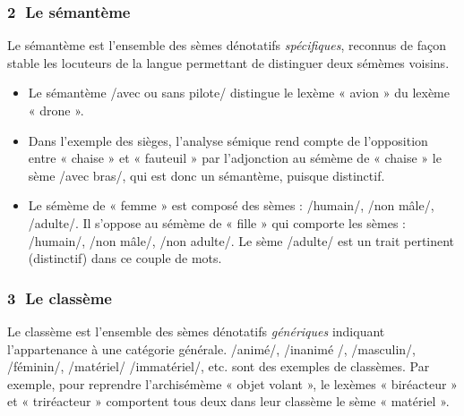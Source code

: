 \subsubsection*{\textcircled{\scriptsize 2} Le sémantème}
Le sémantème est l’ensemble des sèmes dénotatifs \textit{spécifiques}, reconnus de façon stable les locuteurs de la langue permettant de distinguer deux sémèmes voisins.
\begin{itemize}
\item Le sémantème /avec ou sans pilote/ distingue le lexème « avion » du lexème « drone ».
\item Dans l’exemple des sièges, l’analyse sémique rend compte de l’opposition entre « chaise » et « fauteuil » par l’adjonction au sémème de « chaise » le sème /avec bras/, qui est donc un sémantème, puisque distinctif.
\item Le sémème de « femme » est composé des sèmes : /humain/, /non mâle/, /adulte/. Il s’oppose au sémème de « fille » qui comporte les sèmes : /humain/, /non mâle/, /non adulte/. Le sème /adulte/ est un trait pertinent (distinctif) dans ce couple de mots.
\end{itemize}

\subsubsection*{\textcircled{\scriptsize 3} Le classème}
Le classème est l’ensemble des sèmes dénotatifs \textit{génériques} indiquant l’appartenance à une catégorie générale. /animé/, /inanimé /, /masculin/, /féminin/, /matériel/ /immatériel/, etc. sont des exemples de classèmes. Par exemple, pour reprendre l’archisémème « objet volant », le lexèmes « biréacteur » et « triréacteur » comportent tous deux dans leur classème le sème « matériel ».

